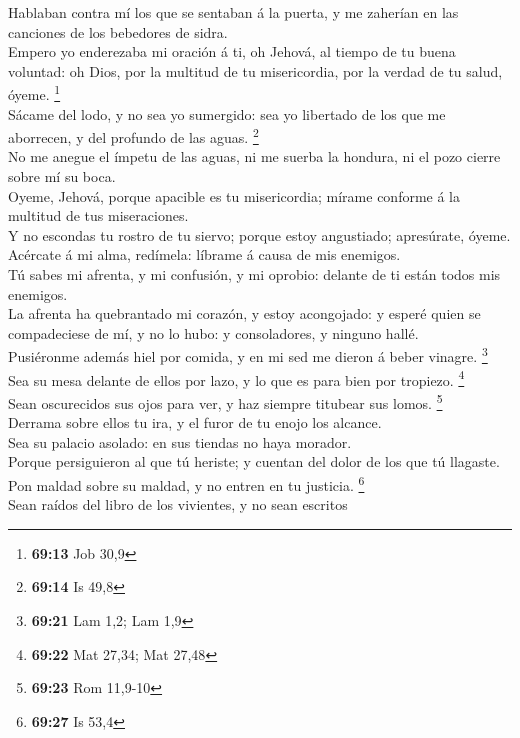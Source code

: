  Hablaban contra mí los que se sentaban á la puerta, y me
zaherían en las canciones de los bebedores de sidra.\\
 Empero yo enderezaba mi oración á ti, oh Jehová, al tiempo
de tu buena voluntad: oh Dios, por la multitud de tu misericordia, por
la verdad de tu salud, óyeme. \footnote{\textbf{69:13} Job 30,9}\\
 Sácame del lodo, y no sea yo sumergido: sea yo libertado
de los que me aborrecen, y del profundo de las aguas. \footnote{\textbf{69:14}
  Is 49,8}\\
 No me anegue el ímpetu de las aguas, ni me suerba la
hondura, ni el pozo cierre sobre mí su boca.\\
 Oyeme, Jehová, porque apacible es tu misericordia; mírame
conforme á la multitud de tus miseraciones.\\
 Y no escondas tu rostro de tu siervo; porque estoy
angustiado; apresúrate, óyeme.\\
 Acércate á mi alma, redímela: líbrame á causa de mis
enemigos.\\
 Tú sabes mi afrenta, y mi confusión, y mi oprobio: delante
de ti están todos mis enemigos.\\
 La afrenta ha quebrantado mi corazón, y estoy acongojado:
y esperé quien se compadeciese de mí, y no lo hubo: y consoladores, y
ninguno hallé.\\
 Pusiéronme además hiel por comida, y en mi sed me dieron á
beber vinagre. \footnote{\textbf{69:21} Lam 1,2; Lam 1,9}\\
 Sea su mesa delante de ellos por lazo, y lo que es para
bien por tropiezo. \footnote{\textbf{69:22} Mat 27,34; Mat 27,48}\\
 Sean oscurecidos sus ojos para ver, y haz siempre titubear
sus lomos. \footnote{\textbf{69:23} Rom 11,9-10}\\
 Derrama sobre ellos tu ira, y el furor de tu enojo los
alcance.\\
 Sea su palacio asolado: en sus tiendas no haya morador.\\
 Porque persiguieron al que tú heriste; y cuentan del dolor
de los que tú llagaste.\\
 Pon maldad sobre su maldad, y no entren en tu justicia.
\footnote{\textbf{69:27} Is 53,4}\\
 Sean raídos del libro de los vivientes, y no sean escritos

